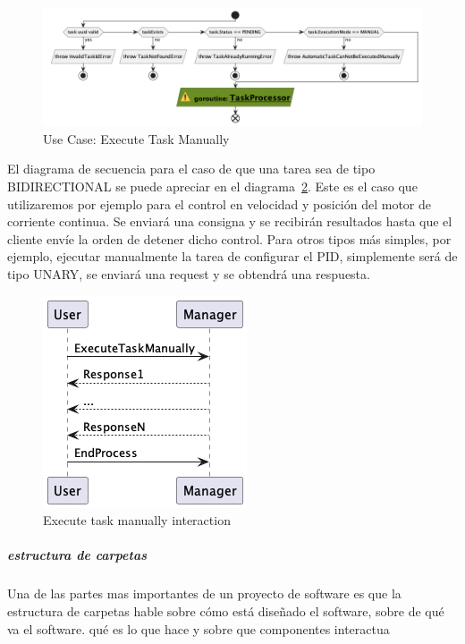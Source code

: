 \begin{figure}[H]
    \centering
    \includegraphics[height=0.2\textheight]{./part/Proyecto_ejecutivo/memoria_descriptiva/descripcionDelProyecto/manager/uml/1-executeTaskManual}
    \caption{Use Case: Execute Task Manually}\label{fig:Use Case-Execute Task Manually}
\end{figure}

El diagrama de secuencia para el caso de que una tarea sea de tipo BIDIRECTIONAL se puede apreciar en el diagrama~\cref{fig:executeTaskManualInteraction}. Este es el caso que utilizaremos por ejemplo para el control en velocidad y posición del motor de corriente continua. Se enviará una consigna y se recibirán resultados hasta que el cliente envíe la orden de detener dicho control. Para otros tipos más simples, por ejemplo, ejecutar manualmente la tarea de configurar el PID, simplemente será de tipo UNARY, se enviará una request y se obtendrá una respuesta.

\begin{figure}[H]
    \centering
    \includegraphics[height=0.2\textheight]{./part/Proyecto_ejecutivo/memoria_descriptiva/descripcionDelProyecto/manager/uml/1-ExecuteTaskManuallyInteraction}
    \caption{Execute task manually interaction}\label{fig:executeTaskManualInteraction}
\end{figure}

\subparagraph{estructura de carpetas}

Una de las partes mas importantes de un proyecto de software es que la estructura de carpetas hable sobre cómo está diseñado el software, sobre de qué va el software. qué es lo que hace y sobre que componentes interactua



